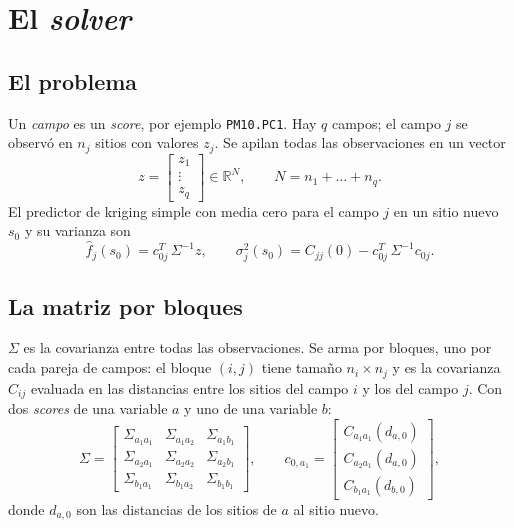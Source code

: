 \documentclass[11pt,a4paper]{article}
\newcommand{\code}[1]{\texttt{#1}}
\begin{document}
\section{El \emph{solver}}

\subsection{El problema}

Un \emph{campo} es un \emph{score}, por ejemplo \code{PM10.PC1}. Hay $q$
campos; el campo $j$ se observó en $n_j$ sitios con valores $z_j$. Se apilan
todas las observaciones en un vector
\[
  z = \begin{bmatrix} z_1 \\ \vdots \\ z_q \end{bmatrix}
  \in \mathbb{R}^{N}, \qquad N = n_1 + \dots + n_q .
\]
El predictor de kriging simple con media cero para el campo $j$ en un sitio
nuevo $s_0$ y su varianza son
\begin{equation}
  \hat f_j(s_0) = c_{0j}^{T}\,\Sigma^{-1} z,
  \qquad
  \sigma_j^2(s_0) = C_{jj}(0) - c_{0j}^{T}\,\Sigma^{-1} c_{0j}.
  \label{eq:kriging}
\end{equation}

\subsection{La matriz por bloques}

$\Sigma$ es la covarianza entre todas las observaciones. Se arma por bloques,
uno por cada pareja de campos: el bloque $(i,j)$ tiene tamaño $n_i \times
n_j$ y es la covarianza $C_{ij}$ evaluada en las distancias entre los sitios
del campo $i$ y los del campo $j$. Con dos \emph{scores} de una variable $a$ y
uno de una variable $b$:
\[
  \Sigma =
  \begin{bmatrix}
    \Sigma_{a_1 a_1} & \Sigma_{a_1 a_2} & \Sigma_{a_1 b_1} \\
    \Sigma_{a_2 a_1} & \Sigma_{a_2 a_2} & \Sigma_{a_2 b_1} \\
    \Sigma_{b_1 a_1} & \Sigma_{b_1 a_2} & \Sigma_{b_1 b_1}
  \end{bmatrix},
  \qquad
  c_{0,a_1} =
  \begin{bmatrix}
    C_{a_1 a_1}(d_{a,0}) \\ C_{a_2 a_1}(d_{a,0}) \\ C_{b_1 a_1}(d_{b,0})
  \end{bmatrix},
\]
donde $d_{a,0}$ son las distancias de los sitios de $a$ al sitio nuevo.
\end{document}
